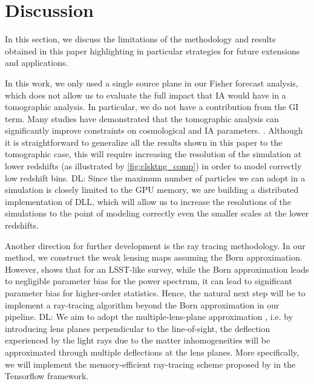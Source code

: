 \documentclass[twocolumn,twocolappendix]{aastex63}
\newcommand{\denise}[1]{{\color{red}DL: #1}}
\begin{document}
\section{Discussion}\label{Discussion}
In this section, we discuss the limitations of the methodology and results obtained in this paper highlighting in particular strategies for future extensions and  applications. 
 

In this work, we only used a single source plane in our Fisher forecast analysis, which does not allow us to evaluate the full impact that IA would have in a tomographic analysis. In particular, we do not have a contribution from the GI term. Many studies have demonstrated that the tomographic analysis can significantly improve constraints on cosmological and IA parameters.  \citep{king2003separating, heymans2004weak, troxel2015intrinsic}. Although it is straightforward to generalize all the results shown in this paper to the tomographic case, this will require increasing the resolution of the simulation at lower redshifts (as illustrated by \autoref{fig:clsktng_comp}) in order to model correctly low redshift bins. \denise{Since the maximum number of particles we can adopt in a simulation is closely limited to the GPU memory, we are building a distributed implementation of DLL, which will allow us to increase the resolutions of the simulations to the point of modeling correctly even the smaller scales at the lower redshifts.
}

Another direction for further development is the ray tracing methodology. In our method, we construct the weak lensing maps assuming the Born approximation. However, \cite{petri2017validity} shows that for an LSST-like survey, while the Born approximation leads to negligible parameter bias for the power spectrum, it can lead to significant parameter bias for higher-order statistics. 
Hence, the natural next step will be to implement a ray-tracing algorithm beyond the Born approximation in our pipeline.
\denise{ We aim to adopt the multiple-lens-plane approximation \citep{1986ApJ...310..568B, Stella_Seitz_1994, jain2000ray, Vale_2003, refId0}, i.e. by introducing lens planes perpendicular to the line-of-sight, the deflection experienced by the light rays due to the matter inhomogeneities will be approximated through multiple deflections at the lens planes. 
More specifically, we will implement the memory-efficient ray-tracing scheme proposed by \cite{refId0} in the Tensorflow framework.}
\end{document}
